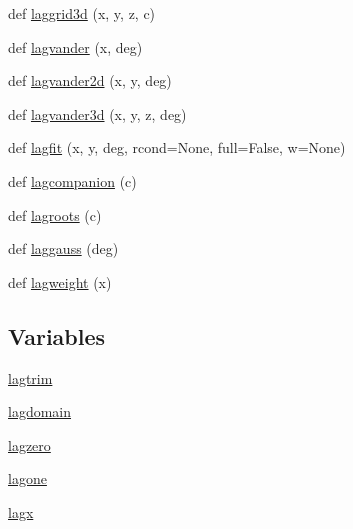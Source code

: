 \begin{DoxyCompactItemize}
\item 
def \hyperlink{namespacenumpy_1_1polynomial_1_1laguerre_aba188279f8db273b635c947471cc136a}{laggrid3d} (x, y, z, c)
\item 
def \hyperlink{namespacenumpy_1_1polynomial_1_1laguerre_afacaffe8b7ed724f079e00f647a20a56}{lagvander} (x, deg)
\item 
def \hyperlink{namespacenumpy_1_1polynomial_1_1laguerre_a0b846b15382955c8fd4a133d8268610f}{lagvander2d} (x, y, deg)
\item 
def \hyperlink{namespacenumpy_1_1polynomial_1_1laguerre_a0671cd9891d0a6dfc5f03f020460ff33}{lagvander3d} (x, y, z, deg)
\item 
def \hyperlink{namespacenumpy_1_1polynomial_1_1laguerre_a1c0142c5afa10917e9bff853fa89ebde}{lagfit} (x, y, deg, rcond=None, full=False, w=None)
\item 
def \hyperlink{namespacenumpy_1_1polynomial_1_1laguerre_a7e55177ec454279a32b19dc51574bb40}{lagcompanion} (c)
\item 
def \hyperlink{namespacenumpy_1_1polynomial_1_1laguerre_aec765526a8f733a4f6d6ae9bdfb982d2}{lagroots} (c)
\item 
def \hyperlink{namespacenumpy_1_1polynomial_1_1laguerre_abe68bc18d3e9df3bb43bff1719f58687}{laggauss} (deg)
\item 
def \hyperlink{namespacenumpy_1_1polynomial_1_1laguerre_adbd0efc350111d55b6070e0c2e8b3c14}{lagweight} (x)
\end{DoxyCompactItemize}
\subsection*{Variables}
\begin{DoxyCompactItemize}
\item 
\hyperlink{namespacenumpy_1_1polynomial_1_1laguerre_adeeb1cb601d4f4d7e8ab5d5381f711ea}{lagtrim}
\item 
\hyperlink{namespacenumpy_1_1polynomial_1_1laguerre_a0ef347a0d570840a3010868aa7762eca}{lagdomain}
\item 
\hyperlink{namespacenumpy_1_1polynomial_1_1laguerre_a7c8c9ec6231677d7dc54069b5ecdeea0}{lagzero}
\item 
\hyperlink{namespacenumpy_1_1polynomial_1_1laguerre_aca908a3bb4e58b816a8e21d760542df8}{lagone}
\item 
\hyperlink{namespacenumpy_1_1polynomial_1_1laguerre_a623b199076cc4872f30ab7a9171436ee}{lagx}
\end{DoxyCompactItemize}


